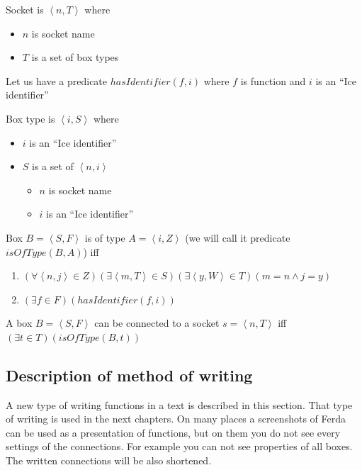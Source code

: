 \documentclass[a4paper,12pt]{book}
\begin{document}
\begin{mydef}
Socket is $\left<n,T\right>$ where
\begin{itemize}
	\item $n$ is socket name
	\item $T$ is a set of box types
\end{itemize}
\end{mydef}

\begin{mydef}
Let us have a predicate $hasIdentifier(f,i)$ where $f$ is function and $i$ is an ``Ice identifier''
\end{mydef}

\begin{mydef}
Box type is $\left<i,S\right>$ where
\begin{itemize}
	\item $i$ is an ``Ice identifier''
	\item $S$ is a set of $\left<n,i\right>$
	\begin{itemize}
		\item $n$ is socket name
		\item $i$ is an ``Ice identifier''
	\end{itemize}
\end{itemize}
\end{mydef}

\begin{mydef}
Box $B=\left<S,F\right>$ is of type $A=\left<i,Z\right>$ (we will call it predicate $isOfType(B,A)$) iff 
\begin{enumerate}
	\item $(\forall \left<n,j\right>\in Z)(\exists \left<m,T\right>\in S)(\exists \left<y,W\right>\in T)(m=n \wedge j=y)$
	\item $(\exists f\in F)(hasIdentifier(f,i))$
\end{enumerate}
\end{mydef}

\begin{mydef}
A box $B=\left<S,F\right>$ can be connected to a socket $s=\left<n,T\right>$ iff $(\exists t\in T)(isOfType(B,t))$
\end{mydef}

\subsection{Description of method of writing}
\label{sec:formalisation}
A new type of writing functions in a text is described in this section. That type of writing is used in the next chapters. On many places a screenshots of Ferda can be used as a presentation of functions, but on them you do not see every settings of the connections. For example you can not see properties of all boxes. The written connections will be also shortened.
\end{document}
